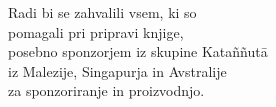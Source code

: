
\begin{quotepage}{\linewidth}
\centering\small

Radi bi se zahvalili vsem, ki so\\
pomagali pri pripravi knjige,\\
posebno sponzorjem iz skupine Kataññutā\\
iz Malezije, Singapurja in Avstralije\\
za sponzoriranje in proizvodnjo.

\end{quotepage}
